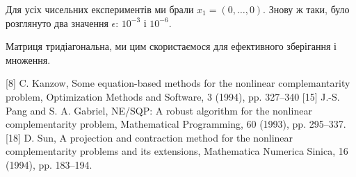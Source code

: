 Для усіх чисельних експериментів ми брали $x_1 = (0, \dots, 0)$. Знову ж таки, було розглянуто два значення $\epsilon$: $10^{-3}$ і $10^{-6}$.

\begin{remark}
    Матриця тридіагональна, ми цим скористаємося для ефективного зберігання і множення.
\end{remark}

[8] C. Kanzow, Some equation-based methods for the nonlinear complemantarity problem, Optimization Methods and Software, 3 (1994), pp. 327–340
[15] J.-S. Pang and S. A. Gabriel, NE/SQP: A robust algorithm for the nonlinear complementarity problem, Mathematical Programming, 60 (1993), pp. 295–337.
[18] D. Sun, A projection and contraction method for the nonlinear complementarity problems
and its extensions, Mathematica Numerica Sinica, 16 (1994), pp. 183–194.
